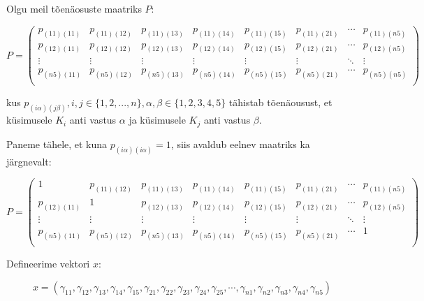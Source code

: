 \documentclass[a4paper]{article}
\newenvironment{tightcenter}{%
  \setlength\topsep{0pt}
  \setlength\parskip{0pt}
  \begin{center}
}{%
  \end{center}
}
\begin{document}
Olgu meil tõenäosuste maatriks $P$:
\begin{tightcenter}
\begin{equation*}
P =
\begin{pmatrix}
p_{(11)(11)}&p_{(11)(12)}&p_{(11)(13)}&p_{(11)(14)}&p_{(11)(15)}&p_{(11)(21)}&\cdots&p_{(11)(n5)} \\
p_{(12)(11)}&p_{(12)(12)}&p_{(12)(13)}&p_{(12)(14)}&p_{(12)(15)}&p_{(12)(21)}&\cdots&p_{(12)(n5)} \\
\vdots&\vdots&\vdots&\vdots&\vdots&\vdots&\ddots&\vdots \\
p_{(n5)(11)}&p_{(n5)(12)}&p_{(n5)(13)}&p_{(n5)(14)}&p_{(n5)(15)}&p_{(n5)(21)}&\cdots&p_{(n5)(n5)} \\
\end{pmatrix} 
\end{equation*}
\end{tightcenter}

kus  $p_{(i \alpha) (j \beta)}, i,j \in \{1,2,...,n\}, \alpha , \beta \in \{1,2,3,4,5\}$ tähistab tõenäousust, et k\"usimusele $K_i$ anti vastus $\alpha$ ja k\"usimusele $K_j$ anti vastus $\beta$. 

Paneme tähele, et kuna $p_{(i \alpha)( i \alpha)} = 1$, siis avaldub eelnev maatriks ka järgnevalt:

\begin{tightcenter}
\begin{equation*}
P =
\begin{pmatrix}
1&p_{(11)(12)}&p_{(11)(13)}&p_{(11)(14)}&p_{(11)(15)}&p_{(11)(21)}&\cdots&p_{(11)(n5)} \\
p_{(12)(11)}&1&p_{(12)(13)}&p_{(12)(14)}&p_{(12)(15)}&p_{(12)(21)}&\cdots&p_{(12)(n5)} \\
\vdots&\vdots&\vdots&\vdots&\vdots&\vdots&\ddots&\vdots \\
p_{(n5)(11)}&p_{(n5)(12)}&p_{(n5)(13)}&p_{(n5)(14)}&p_{(n5)(15)}&p_{(n5)(21)}&\cdots&1\\
\end{pmatrix} 
\end{equation*}
\end{tightcenter}


Defineerime  vektori $x$:

\begin{tightcenter}
\begin{equation*}
x = (\gamma_{11},\gamma_{12},\gamma_{13} ,\gamma_{14},\gamma_{15},\gamma_{21},\gamma_{22},\gamma_{23},\gamma_{24},\gamma_{25}, \cdots ,\gamma_{n1},\gamma_{n2},\gamma_{n3},\gamma_{n4},\gamma_{n5})
\end{equation*}
\end{tightcenter}
\end{document}
